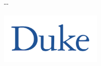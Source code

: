 \documentclass{article}%
\newenvironment{fullwidth}{ %
	\begin{adjustwidth}{}{\dimexpr-\marginparwidth-\marginparsep\relax} %
}{
	\end{adjustwidth}
}
\newlength{\fulltextwidth}
\newcommand{\reporttitle}[1]{\renewcommand{\reporttitle}{#1}}
\newcommand{\reportsubtitle}[1]{\renewcommand{\reportsubtitle}{#1}}
\newcommand{\reportauthors}[1]{\renewcommand{\reportauthors}{#1}}
\newcommand{\reportdate}[1]{\renewcommand{\reportdate}{#1}}
\begin{document}
%
\normalsize%

\thispagestyle{empty} %

\begin{fullwidth} %
	\vspace*{-0.075\textheight} %
	
	\hfill\includegraphics[width=5cm]{duke_logo} %

	\vspace{0.15\textheight} %

	\parbox{0.9\fulltextwidth}{\fontsize{50pt}{52pt}\selectfont\raggedright\textbf{\reporttitle}\par} %
	
	\vspace{0.03\textheight} %
	
	{\LARGE\textit{\textbf{\reportsubtitle}}\par} %
	
	\vfill %
	
	{\Large\reportauthors\par} %
	
	\vfill\vfill\vfill %
	
	{\large\reportdate\par} %
\end{fullwidth}

\newpage


\thispagestyle{empty} %
\end{document}
